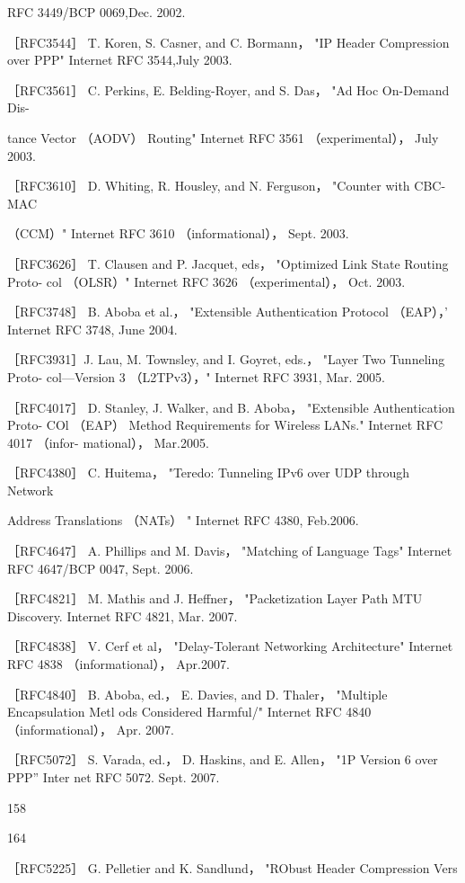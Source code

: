 RFC 3449/BCP 0069,Dec. 2002.

［RFC3544］ T. Koren, S. Casner, and C. Bormann， "IP Header Compression over
PPP" Internet RFC 3544,July 2003.

［RFC3561］ C. Perkins, E. Belding-Royer, and S. Das， "Ad Hoc On-Demand Dis-

tance Vector （AODV） Routing" Internet RFC 3561 （experimental）， July 2003.

［RFC3610］ D. Whiting, R. Housley, and N. Ferguson， "Counter with CBC-MAC

（CCM）" Internet RFC 3610 （informational）， Sept. 2003.

［RFC3626］ T. Clausen and P. Jacquet, eds， "Optimized Link State Routing Proto-
col （OLSR）" Internet RFC 3626 （experimental）， Oct. 2003.

［RFC3748］ B. Aboba et al.， "Extensible Authentication Protocol （EAP），' Internet
RFC 3748, June 2004.

［RFC3931］J. Lau, M. Townsley, and I. Goyret, eds.， "Layer Two Tunneling Proto-
col—Version 3 （L2TPv3），" Internet RFC 3931, Mar. 2005.

［RFC4017］ D. Stanley, J. Walker, and B. Aboba， "Extensible Authentication Proto-
COl （EAP） Method Requirements for Wireless LANs." Internet RFC 4017 （infor-
mational）， Mar.2005.

［RFC4380］ C. Huitema， "Teredo: Tunneling IPv6 over UDP through Network

Address Translations （NATs） " Internet RFC 4380, Feb.2006.

［RFC4647］ A. Phillips and M. Davis， "Matching of Language Tags" Internet RFC
4647/BCP 0047, Sept. 2006.

［RFC4821］ M. Mathis and J. Heffner， "Packetization Layer Path MTU Discovery.
Internet RFC 4821, Mar. 2007.

［RFC4838］ V. Cerf et al， "Delay-Tolerant Networking Architecture" Internet RFC
4838 （informational）， Apr.2007.

［RFC4840］ B. Aboba, ed.， E. Davies, and D. Thaler， "Multiple Encapsulation Metl
ods Considered Harmful/" Internet RFC 4840 （informational）， Apr. 2007.

［RFC5072］ S. Varada, ed.， D. Haskins, and E. Allen， "1P Version 6 over PPP” Inter
net RFC 5072. Sept. 2007.

158

164

［RFC5225］ G. Pelletier and K. Sandlund， "RObust Header Compression Vers

